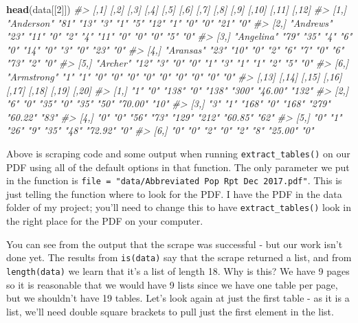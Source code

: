 \documentclass[
  12pt,
]{book}
\newenvironment{Shaded}{\begin{snugshade}}{\end{snugshade}}
\newcommand{\CommentTok}[1]{\textcolor[rgb]{0.37,0.37,0.37}{\textit{#1}}}
\newcommand{\DecValTok}[1]{\textcolor[rgb]{0.06,0.06,0.06}{#1}}
\newcommand{\KeywordTok}[1]{\textcolor[rgb]{0.27,0.27,0.27}{\textbf{#1}}}
\newcommand{\NormalTok}[1]{#1}
\begin{document}
\begin{Shaded}
\begin{Highlighting}[]
\KeywordTok{head}\NormalTok{(data[[}\DecValTok{2}\NormalTok{]])}
\CommentTok{\#>      [,1]        [,2] [,3] [,4] [,5] [,6] [,7] [,8] [,9] [,10] [,11] [,12]}
\CommentTok{\#> [1,] "Anderson"  "81" "13" "3"  "1"  "5"  "12" "1"  "0"  "0"   "21"  "0"  }
\CommentTok{\#> [2,] "Andrews"   "23" "11" "0"  "2"  "4"  "11" "0"  "0"  "0"   "5"   "0"  }
\CommentTok{\#> [3,] "Angelina"  "79" "35" "4"  "6"  "0"  "14" "0"  "3"  "0"   "23"  "0"  }
\CommentTok{\#> [4,] "Aransas"   "23" "10" "0"  "2"  "6"  "7"  "0"  "6"  "73"  "2"   "0"  }
\CommentTok{\#> [5,] "Archer"    "12" "3"  "0"  "0"  "1"  "3"  "1"  "1"  "2"   "5"   "0"  }
\CommentTok{\#> [6,] "Armstrong" "1"  "1"  "0"  "0"  "0"  "0"  "0"  "0"  "0"   "0"   "0"  }
\CommentTok{\#>      [,13] [,14] [,15] [,16] [,17] [,18] [,19]   [,20]}
\CommentTok{\#> [1,] "1"   "0"   "138" "0"   "138" "300" "46.00" "132"}
\CommentTok{\#> [2,] "6"   "0"   "35"  "0"   "35"  "50"  "70.00" "10" }
\CommentTok{\#> [3,] "3"   "1"   "168" "0"   "168" "279" "60.22" "83" }
\CommentTok{\#> [4,] "0"   "0"   "56"  "73"  "129" "212" "60.85" "62" }
\CommentTok{\#> [5,] "0"   "1"   "26"  "9"   "35"  "48"  "72.92" "0"  }
\CommentTok{\#> [6,] "0"   "0"   "2"   "0"   "2"   "8"   "25.00" "0"}
\end{Highlighting}
\end{Shaded}

Above is scraping code and some output when running \texttt{extract\_tables()} on our PDF using all of the default options in that function. The only parameter we put in the function is \texttt{file\ =\ "data/Abbreviated\ Pop\ Rpt\ Dec\ 2017.pdf"}. This is just telling the function where to look for the PDF. I have the PDF in the data folder of my project; you'll need to change this to have \texttt{extract\_tables()} look in the right place for the PDF on your computer.

You can see from the output that the scrape was successful - but our work isn't done yet. The results from \texttt{is(data)} say that the scrape returned a list, and from \texttt{length(data)} we learn that it's a list of length 18. Why is this? We have 9 pages so it is reasonable that we would have 9 lists since we have one table per page, but we shouldn't have 19 tables. Let's look again at just the first table - as it is a list, we'll need double square brackets to pull just the first element in the list.
\end{document}
